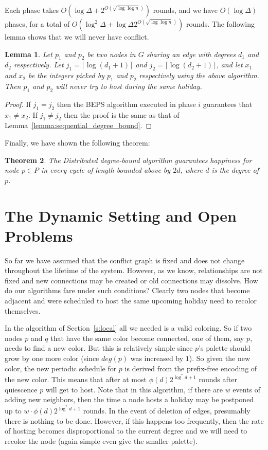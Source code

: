 \documentclass[11pt]{article}
\newtheorem{theorem}{Theorem}[section]
\newtheorem{lemma}[theorem]{Lemma}
\begin{document}
Each phase takes $O(\log \Delta + 2^{O(\sqrt{\log \log n})})$ rounds, and we have $O(\log \Delta)$ phases, for a total of $O(\log ^2 \Delta + \log \Delta 2^{O(\sqrt{\log \log n})})$ rounds. The following lemma shows that we will never have conflict.

\begin{lemma}\label{lemma:dist_degree_bound}
Let $p_1$ and $p_2$ be two nodes in $G$ sharing an edge with degrees $d_1$ and $d_2$ respectively. Let $j_1=\lceil \log (d_1+1) \rceil$ and $j_2=\lceil \log (d_2+1) \rceil$, and let $x_1$ and $x_2$ be the integers picked by $p_1$ and $p_2$ respectively using the above algorithm. Then $p_1$ and $p_2$ will never try to host during the same holiday.
\end{lemma}
\begin{proof}
If $j_1 = j_2$ then the BEPS algorithm executed in phase $i$ guarantees that $x_1 \neq x_2$. If $j_1  \neq j_2$ then the proof is the same as that of Lemma~\ref{lemma:sequential_degree_bound}.
\end{proof}

Finally, we have shown the following theorem:

\begin{theorem}
The Distributed degree-bound algorithm guarantees happiness for node
$p\in P$ in every cycle of length bounded above by $2d$, where
$d$ is the degree of $p$.

\end{theorem}

\section{The Dynamic Setting and Open Problems}
\label{s:dynamic}

So far we have assumed that the conflict graph is fixed and does not change throughout the lifetime of the system. However, as we know, relationships are not fixed and new connections may be created or old connections may dissolve. How do our algorithms fare under such conditions? Clearly two nodes that become adjacent and were scheduled to host the same upcoming holiday need to recolor themselves.

In the algorithm of Section~\ref{s:local} all we needed is a valid coloring. So if two nodes $p$ and $q$ that have the same color become connected, one of them, say $p$, needs to find a new color. But this is relatively simple since $p$'s palette should grow by one more color (since $deg(p)$ was increased by $1$). So given the new color, the new periodic schedule for $p$ is derived from the prefix-free encoding of the new color. This means that after at most  $\phi(d) 2^{\log^*d+1}$ rounds after quiescence $p$ will get to host. Note that in this algorithm, if there are $w$ events of adding new neighbors, then the time a node hosts a holiday may be postponed up to $w \cdot  \phi(d) 2^{\log^*d+1}$ rounds. In the event of deletion of edges, presumably there is nothing to be done. However, if this happens too frequently, then the rate of hosting becomes disproportional to the current degree and we will need to recolor the node (again simple even give the smaller palette).
\end{document}
